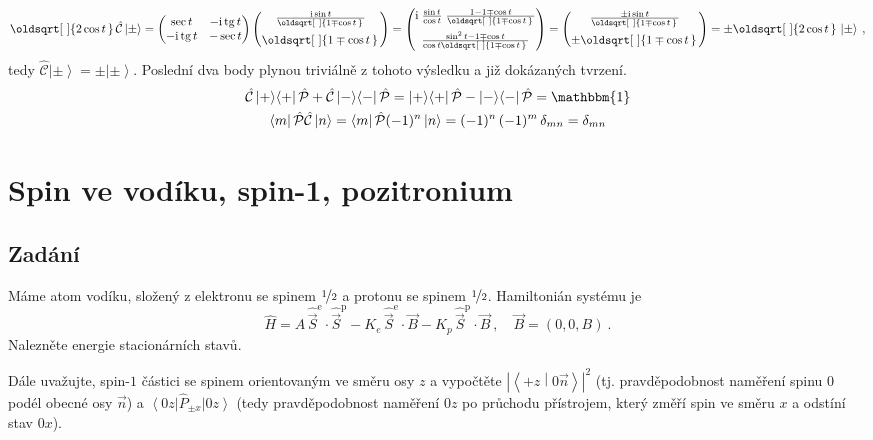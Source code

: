 \documentclass[10pt,a4paper]{article}
\renewcommand*{\sqrt}[2][\ ]{\oldsqrt[#1]{#2\,}\,}
\newcommand{\const}[1]{\text{#1}}
\newcommand{\mat}[1]{
    \begin{pmatrix}
        #1
    \end{pmatrix}
}
\newcommand{\bra}[1]{\left< #1 \right|}
\newcommand{\ket}[1]{\left| #1 \right>}
\newcommand{\braket}[2]{\left< #1 \middle| #2 \right>}
\renewcommand{\i}{\const{i}}
\def\tg{\operatorname{tg}}
\def\1{\mathbbm{1}}
\def\Parity{\hat{\mathcal P}}
\def\Cop{\hat{\mathcal C}}
\begin{document}
\begin{align*}
    \sqrt{2\cos t} \Cop \ket\pm
    =
    \mat{
        \sec t & -\i\tg t \\
        -\i\tg t & -\sec t
    }
    \mat{
        \frac{\i \sin t}{\sqrt{1 \mp \cos t}} \\[7pt]
        \sqrt{1 \mp \cos t}
    }
    =
    \mat{
        \i \; \frac{\sin t}{\cos t} \; \frac{1 - 1 \mp \cos t}{\sqrt{1 \mp \cos t}} \\[7pt]
        \frac{\sin^2 t - 1 \mp \cos t}{\cos t \sqrt{1 \mp \cos t}}
    }
    =
    \mat{
        \frac{\pm \i \sin t}{\sqrt{1 \mp \cos t}} \\[7pt]
        \pm \sqrt{1 \mp \cos t}
    }
    =
    \pm \sqrt{2\cos t} \ket\pm \: ,
\end{align*}
tedy $\Cop\ket\pm=\pm\ket\pm$. Poslední dva body plynou triviálně z tohoto výsledku a již dokázaných tvrzení.
\begin{gather*}
    \Cop\ket{+}\!\bra{+}\Parity + \Cop\ket{-}\!\bra{-}\Parity
    = \ket{+}\!\bra{+}\Parity - \ket{-}\!\bra{-}\Parity = \1
    \\
    \bra{m} \Parity \Cop \ket{n} = \bra{m} \Parity (-1)^n \ket{n} = (-1)^n \, (-1)^m \, \delta_{mn} = \delta_{mn}
\end{gather*}


\section{Spin ve vodíku, spin-1, pozitronium}
\subsection{Zadání}
Máme atom vodíku, složený z elektronu se spinem $\nicefrac{1}{2}$ a protonu se spinem $\nicefrac{1}{2}$. Hamiltonián systému je
\begin{equation*}
    \hat H
    = A \, \hat{\vec S}^\const{e} \!\cdot\! \hat{\vec S}^\const{p}
    - K_e \, \hat{\vec S}^\const{e} \!\cdot\! \vec B
    - K_p \, \hat{\vec S}^\const{p} \!\cdot\! \vec B
    \: , \quad
    \vec B = (0, 0, B)
    \: .
\end{equation*}
Nalezněte energie stacionárních stavů.

Dále uvažujte, spin-$1$ částici se spinem orientovaným ve směru osy $z$ a vypočtěte $\left| \braket{+z}{0 \vec{n}} \right|^2$ (tj. pravděpodobnost naměření spinu $0$ podél obecné osy $\vec n$) a $\bra{0z} \hat P_{\pm x} \ket{0z}$ (tedy pravděpodobnost naměření $0z$ po průchodu přístrojem, který změří spin ve směru $x$ a odstíní stav $0x$).
\end{document}
